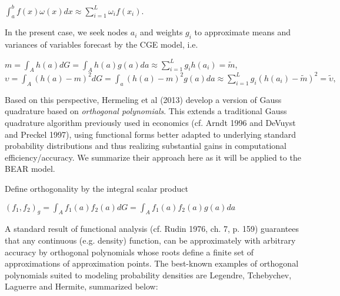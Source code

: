 \documentclass{article}
\begin{document}
\begin{center}

$\int^b_a f(x)\omega(x)dx \approx \displaystyle \sum^L_{i=1} \omega_i f(x_i).$

\end{center}

In the present case, we seek nodes $a_i$ and weights $g_i$ to approximate means and variances of variables forecast by the CGE model, i.e.

\begin{center}

$m = \int_A h(a)dG = \int_A h(a)g(a)da \approx \displaystyle \sum^L_{i=1} g_i h(a_i) = \tilde{m}$,\\[20pt]

$\upsilon = \int_A (h(a) - m)^2 dG = \int_a (h(a) - m)^2 g(a)da \approx \displaystyle \sum^L_{i=1} g_i(h(a_i)-\tilde{m})^2 = \tilde{\upsilon},$

\end{center}

Based on this perspective, Hermeling et al (2013) develop a version of Gauss quadrature based on \textit{orthogonal polynomials}. This extends a traditional Gauss quadrature algorithm previously used in economics (cf. Arndt 1996 and DeVuyst and Preckel 1997), using functional forms better adapted to underlying standard probability distributions and thus realizing substantial gains in computational efficiency/accuracy. We summarize their approach here as it will be applied to the BEAR model.

Define orthogonality by the integral scalar product

\begin{center}

$(f_1, f_2)_g = \int_A f_1(a) f_2(a) dG = \int_A f_1(a) f_2(a) g(a) da$

\end{center}

A standard result of functional analysis (cf. Rudin 1976, ch. 7, p. 159) guarantees that any continuous (e.g. density) function, can be approximately with arbitrary accuracy by orthogonal polynomials whose roots define a finite set of approximations of approximation points. The best-known examples of orthogonal polynomials suited to modeling probability densities are Legendre, Tchebychev, Laguerre and Hermite, summarized below:
\end{document}
